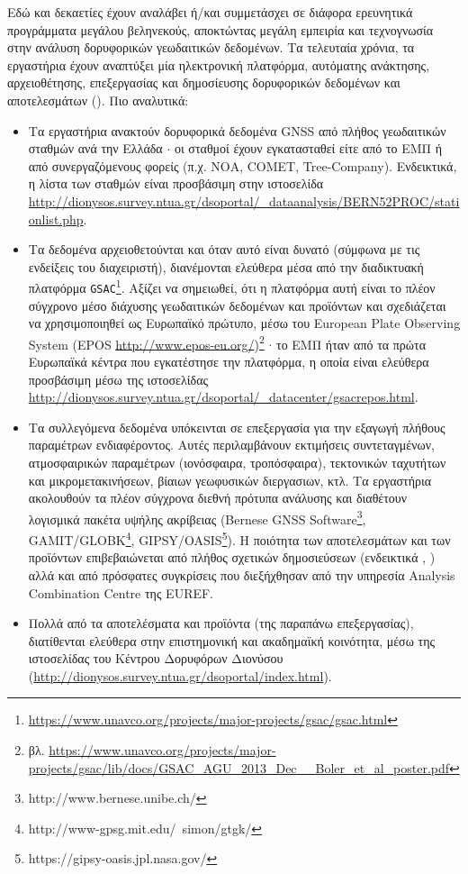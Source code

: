 \documentclass[11pt]{article}
\begin{document}
Εδώ και δεκαετίες έχουν αναλάβει ή/και συμμετάσχει σε διάφορα ερευνητικά προγράμματα μεγάλου βεληνεκούς, αποκτώντας μεγάλη εμπειρία και τεχνογνωσία στην ανάλυση δορυφορικών γεωδαιτικών δεδομένων. Τα τελευταία χρόνια, τα εργαστήρια έχουν αναπτύξει μία ηλεκτρονική πλατφόρμα, αυτόματης ανάκτησης, αρχειοθέτησης, επεξεργασίας και δημοσίευσης δορυφορικών δεδομένων και αποτελεσμάτων (\cite{papanikegu}). Πιο αναλυτικά:

\begin{itemize}
\item Τα εργαστήρια ανακτούν δορυφορικά δεδομένα GNSS από πλήθος γεωδαιτικών σταθμών ανά την Ελλάδα $\cdot$ οι σταθμοί έχουν
εγκατασταθεί είτε από το ΕΜΠ ή από συνεργαζόμενους φορείς (π.χ. ΝΟΑ, COMET, Tree-Company). Ενδεικτικά, η λίστα των σταθμών είναι προσβάσιμη στην ιστοσελίδα \url{http://dionysos.survey.ntua.gr/dsoportal/_dataanalysis/BERN52PROC/stationlist.php}.

\item Τα δεδομένα αρχειοθετούνται και όταν αυτό είναι δυνατό (σύμφωνα με τις ενδείξεις του διαχειριστή), διανέμονται ελεύθερα μέσα από την διαδικτυακή πλατφόρμα \texttt{GSAC}\footnote{\url{https://www.unavco.org/projects/major-projects/gsac/gsac.html}}. Αξίζει να σημειωθεί, ότι η πλατφόρμα αυτή είναι το πλέον σύγχρονο μέσο διάχυσης γεωδαιτικών δεδομένων και προϊόντων και σχεδιάζεται να χρησιμοποιηθεί ως Ευρωπαϊκό πρώτυπο, μέσω του European Plate Observing System (EPOS \url{http://www.epos-eu.org/})\footnote{βλ. \url{https://www.unavco.org/projects/major-projects/gsac/lib/docs/GSAC_AGU_2013_Dec__Boler_et_al_poster.pdf}} $\cdot$ το ΕΜΠ ήταν από τα πρώτα Ευρωπαϊκά κέντρα που εγκατέστησε την πλατφόρμα, η οποία είναι ελεύθερα προσβάσιμη μέσω της ιστοσελίδας \url{http://dionysos.survey.ntua.gr/dsoportal/_datacenter/gsacrepos.html}.

\item Τα συλλεγόμενα δεδομένα υπόκεινται σε επεξεργασία για την εξαγωγή πλήθους παραμέτρων ενδιαφέροντος. Αυτές περιλαμβάνουν εκτιμήσεις συντεταγμένων, ατμοσφαιρικών παραμέτρων (ιονόσφαιρα, τροπόσφαιρα), τεκτονικών ταχυτήτων και μικρομετακινήσεων, βίαιων γεωφυσικών διεργασιων, κτλ. Τα εργαστήρια ακολουθούν τα πλέον σύγχρονα διεθνή πρότυπα ανάλυσης και διαθέτουν λογισμικά πακέτα υψήλης ακρίβειας (Bernese GNSS Software\footnote{http://www.bernese.unibe.ch/}, GAMIT/GLOBK\footnote{http://www-gpsg.mit.edu/~simon/gtgk/}, GIPSY/OASIS\footnote{https://gipsy-oasis.jpl.nasa.gov/}). Η ποιότητα των αποτελεσμάτων και των προϊόντων επιβεβαιώνεται από πλήθος σχετικών δημοσιεύσεων (ενδεικτικά \cite{anastacep}, \cite{GRL50066}) αλλά και από πρόσφατες συγκρίσεις που διεξήχθησαν από την υπηρεσία Analysis Combination Centre της EUREF.

\item Πολλά από τα αποτελέσματα και προϊόντα (της παραπάνω επεξεργασίας), διατίθενται ελεύθερα στην επιστημονική και ακαδημαϊκή κοινότητα, μέσω της ιστοσελίδας του Κέντρου Δορυφόρων Διονύσου (\url{http://dionysos.survey.ntua.gr/dsoportal/index.html}).
\end{itemize}
\end{document}
